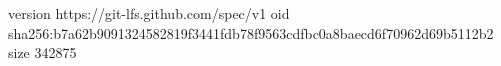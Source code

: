 version https://git-lfs.github.com/spec/v1
oid sha256:b7a62b9091324582819f3441fdb78f9563cdfbc0a8baecd6f70962d69b5112b2
size 342875
